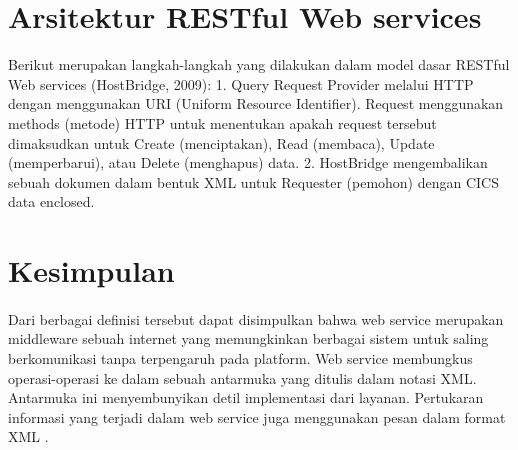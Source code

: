 \documentclass[12pt]{article}
\begin{document}
\section{Arsitektur RESTful Web services}

Berikut merupakan langkah-langkah yang dilakukan dalam model dasar RESTful Web services (HostBridge, 2009):
1. Query Request Provider melalui HTTP dengan menggunakan URI (Uniform Resource Identifier). Request menggunakan methods (metode) HTTP untuk menentukan apakah request tersebut dimaksudkan untuk Create (menciptakan), Read (membaca), Update (memperbarui), atau Delete (menghapus) data.
2. HostBridge mengembalikan sebuah dokumen dalam bentuk XML untuk Requester (pemohon) dengan CICS data enclosed\cite{arsana2014rancang}.
 

\section{Kesimpulan}

\paragraph{}
Dari berbagai definisi tersebut dapat disimpulkan bahwa web service merupakan middleware sebuah internet yang memungkinkan berbagai sistem untuk saling berkomunikasi tanpa terpengaruh pada platform. Web service membungkus operasi-operasi ke dalam sebuah antarmuka yang ditulis dalam notasi XML. Antarmuka ini menyembunyikan detil implementasi dari layanan. Pertukaran informasi yang terjadi dalam web service juga menggunakan pesan dalam format XML \cite{saputra2integrasi}.
\end{document}
